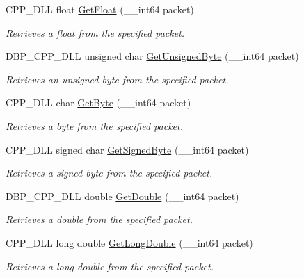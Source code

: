 \begin{DoxyCompactItemize}
CPP\_\-DLL float \hyperlink{namespacemn_a9e7ab9d44114450fd851d6ce89f174d0}{GetFloat} (\_\-\_\-int64 packet)
\begin{DoxyCompactList}\small\item\em Retrieves a float from the specified packet. \item\end{DoxyCompactList}\item 
DBP\_\-CPP\_\-DLL unsigned char \hyperlink{namespacemn_acf8fbb993d19953809ddea61666e9798}{GetUnsignedByte} (\_\-\_\-int64 packet)
\begin{DoxyCompactList}\small\item\em Retrieves an unsigned byte from the specified packet. \item\end{DoxyCompactList}\item 
CPP\_\-DLL char \hyperlink{namespacemn_a82b01bd653c6ea90546ebb31f0130fdd}{GetByte} (\_\-\_\-int64 packet)
\begin{DoxyCompactList}\small\item\em Retrieves a byte from the specified packet. \item\end{DoxyCompactList}\item 
CPP\_\-DLL signed char \hyperlink{namespacemn_aff4353e5aa9c8fce36fe9a88e6f9b82b}{GetSignedByte} (\_\-\_\-int64 packet)
\begin{DoxyCompactList}\small\item\em Retrieves a signed byte from the specified packet. \item\end{DoxyCompactList}\item 
DBP\_\-CPP\_\-DLL double \hyperlink{namespacemn_a46a7e0633c22ff33afa589606673e20d}{GetDouble} (\_\-\_\-int64 packet)
\begin{DoxyCompactList}\small\item\em Retrieves a double from the specified packet. \item\end{DoxyCompactList}\item 
CPP\_\-DLL long double \hyperlink{namespacemn_a2a1faf5fdf08a9c5fee7e3507d1ec6df}{GetLongDouble} (\_\-\_\-int64 packet)
\begin{DoxyCompactList}\small\item\em Retrieves a long double from the specified packet. \item\end{DoxyCompactList}\item 

\end{DoxyCompactItemize}
